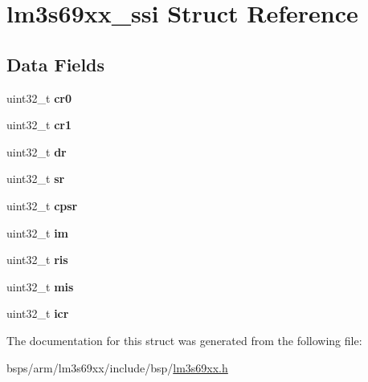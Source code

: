 \hypertarget{structlm3s69xx__ssi}{}\section{lm3s69xx\+\_\+ssi Struct Reference}
\label{structlm3s69xx__ssi}
\subsection*{Data Fields}
\begin{DoxyCompactItemize}
\item 
\mbox{\label{structlm3s69xx__ssi_a878681d7ba83a3fb2c742b08725f97d4}} 
uint32\+\_\+t {\bfseries cr0}
\item 
\mbox{\label{structlm3s69xx__ssi_a4ee313a54944800cdc088dcd0a79326d}} 
uint32\+\_\+t {\bfseries cr1}
\item 
\mbox{\label{structlm3s69xx__ssi_afc018608b211d2f1cc0e6a536f13b75b}} 
uint32\+\_\+t {\bfseries dr}
\item 
\mbox{\label{structlm3s69xx__ssi_af69b2be4e1d6ddda71bcd195038981ff}} 
uint32\+\_\+t {\bfseries sr}
\item 
\mbox{\label{structlm3s69xx__ssi_a9299df55fa64f37bc080a9adaa5603fa}} 
uint32\+\_\+t {\bfseries cpsr}
\item 
\mbox{\label{structlm3s69xx__ssi_ac762518b74b1bbb71052a3ed22af0f2c}} 
uint32\+\_\+t {\bfseries im}
\item 
\mbox{\label{structlm3s69xx__ssi_ac4b6e1e0642d9408c40a358accee4851}} 
uint32\+\_\+t {\bfseries ris}
\item 
\mbox{\label{structlm3s69xx__ssi_a48824616e89d2b4eaa7911005a777165}} 
uint32\+\_\+t {\bfseries mis}
\item 
\mbox{\label{structlm3s69xx__ssi_aa4493c2c00202fa8bd4a209a8b075aeb}} 
uint32\+\_\+t {\bfseries icr}
\end{DoxyCompactItemize}


The documentation for this struct was generated from the following file\+:\begin{DoxyCompactItemize}
\item 
bsps/arm/lm3s69xx/include/bsp/\mbox{\hyperlink{lm3s69xx_8h}{lm3s69xx.\+h}}\end{DoxyCompactItemize}
